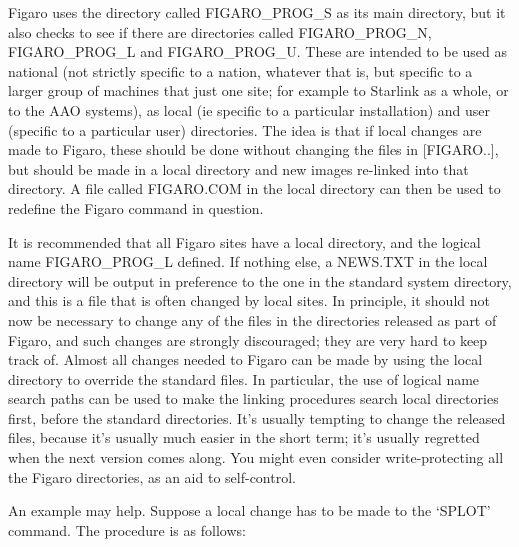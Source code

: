 Figaro uses the directory called FIGARO\_PROG\_S as its main directory,
but it also checks to see if there are directories called FIGARO\_PROG\_N,
FIGARO\_PROG\_L and FIGARO\_PROG\_U. These are intended to be used as
national (not strictly specific to a nation, whatever that is, but specific to
a larger group of machines that just one site; for example to Starlink as a
whole, or to the AAO systems), as local (ie specific to a particular
installation) and user (specific to a particular user) directories.  The 
idea is that if local changes are made to Figaro, these should be done 
without changing the files in [FIGARO..], but should be made in a local
directory and new images re-linked into that directory. A file called 
FIGARO.COM in the local directory can then be used to redefine the Figaro
command in question.

It is recommended that all Figaro sites have a local directory, and the 
logical name FIGARO\_\-PROG\_L defined. If nothing else, a NEWS.TXT in the
local directory will be output in preference to the one in the standard 
system directory, and this is a file that is often changed by local sites. In
principle, it should not now be necessary to change any of the files in the
directories released as part of Figaro, and such changes are strongly
discouraged; they are very hard to keep track of. Almost all changes needed
to Figaro can be made by using the local directory to override the standard
files. In particular, the use of logical name search paths can be used to
make the linking procedures search local directories first, before the 
standard directories.  It's usually tempting to change the released files,
because it's usually much easier in the short term; it's usually regretted
when the next version comes along. You might even consider write-protecting
all the Figaro directories, as an aid to self-control.

An example may help. Suppose a local change has to be made to the `SPLOT'
command. The procedure is as follows:

